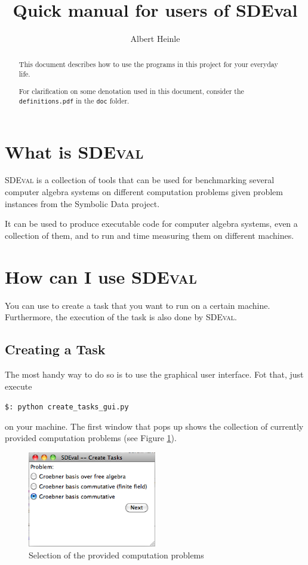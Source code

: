 \documentclass[11pt,a4paper]{amsart}
\numberwithin{equation}{section}
\theoremstyle{definition}
\begin{document}
\title{Quick manual for users of SDEval}
\author{Albert Heinle}
\maketitle
\begin{abstract}
This document describes how to use the programs in this project for your everyday life.

For clarification on some denotation used in this document, consider the \texttt{definitions.pdf} in the \texttt{doc} folder.
\end{abstract}

\section{What is \textsc{SDEval}}

\textsc{SDEval} is a collection of tools that can be used for benchmarking several computer algebra systems on different computation problems given problem instances from the Symbolic Data project.

It can be used to produce executable code for computer algebra systems, even a collection of them, and to run and time measuring them on different machines.

\section{How can I use \textsc{SDEval}}

You can use  to create a task that you want to run on a certain machine. Furthermore, the execution of the task is also done by \textsc{SDEval.}

\subsection{Creating a Task}
The most handy way to do so is to use the graphical user interface. Fot that, just execute

\texttt{\$: python create\_tasks\_gui.py}

on your machine. The first window that pops up shows the collection of currently provided computation problems (see Figure \ref{fig:window1}).

\begin{figure}[ht]
    \includegraphics[width=0.5\textwidth]{pics/window1.png}
    \caption{Selection of the provided computation problems}
    \label{fig:window1}
\end{figure}
\end{document}
